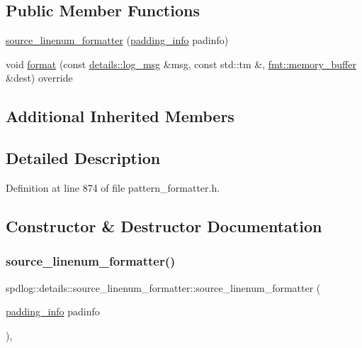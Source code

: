 \subsection*{Public Member Functions}
\begin{DoxyCompactItemize}
\item 
\hyperlink{classspdlog_1_1details_1_1source__linenum__formatter_ac8899bb5c6919498b71f2575f40ca504}{source\+\_\+linenum\+\_\+formatter} (\hyperlink{structspdlog_1_1details_1_1padding__info}{padding\+\_\+info} padinfo)
\item 
void \hyperlink{classspdlog_1_1details_1_1source__linenum__formatter_ac165ced330bd04ea5485e182b9d913a2}{format} (const \hyperlink{structspdlog_1_1details_1_1log__msg}{details\+::log\+\_\+msg} \&msg, const std\+::tm \&, \hyperlink{format_8h_a21cbf729f69302f578e6db21c5e9e0d2}{fmt\+::memory\+\_\+buffer} \&dest) override
\end{DoxyCompactItemize}
\subsection*{Additional Inherited Members}


\subsection{Detailed Description}


Definition at line 874 of file pattern\+\_\+formatter.\+h.



\subsection{Constructor \& Destructor Documentation}
\mbox{\label{classspdlog_1_1details_1_1source__linenum__formatter_ac8899bb5c6919498b71f2575f40ca504}} 
\subsubsection{\texorpdfstring{source\+\_\+linenum\+\_\+formatter()}{source\_linenum\_formatter()}}
{\footnotesize\ttfamily spdlog\+::details\+::source\+\_\+linenum\+\_\+formatter\+::source\+\_\+linenum\+\_\+formatter (\begin{DoxyParamCaption}\item[{\hyperlink{structspdlog_1_1details_1_1padding__info}{padding\+\_\+info}}]{padinfo }\end{DoxyParamCaption})\hspace{0.3cm}{\ttfamily [inline]}, {\ttfamily [explicit]}}



